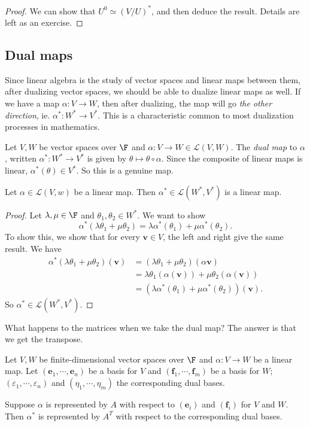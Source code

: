 \documentclass[a4paper]{article}
\begin{document}
\begin{proof}
  We can show that $U^0 \simeq (V/U)^*$, and then deduce the result. Details are left as an exercise.
\end{proof}

\subsection{Dual maps}
Since linear algebra is the study of vector spaces and linear maps between them, after dualizing vector spaces, we should be able to dualize linear maps as well. If we have a map $\alpha: V \to W$, then after dualizing, the map will go \emph{the other direction}, ie. $\alpha^*: W^* \to V^*$. This is a characteristic common to most dualization processes in mathematics.

\begin{defi}
  Let $V, W$ be vector spaces over $\F$ and $\alpha: V\to W \in \mathcal{L}(V, W)$. The \emph{dual map} to $\alpha$, written $\alpha^*: W^* \to V^*$ is given by $\theta \mapsto \theta \circ \alpha$. Since the composite of linear maps is linear, $\alpha^*(\theta) \in V^*$. So this is a genuine map.
\end{defi}

\begin{prop}
  Let $\alpha \in \mathcal{L}(V, w)$ be a linear map. Then $\alpha^* \in \mathcal{L}(W^*, V^*)$ is a linear map.
\end{prop}

\begin{proof}
  Let $\lambda, \mu \in \F$ and $\theta_1, \theta_2 \in W^*$. We want to show
  \[
    \alpha^*(\lambda \theta_1 + \mu \theta_2) = \lambda \alpha^*(\theta_1) + \mu \alpha^*(\theta_2).
  \]
  To show this, we show that for every $\mathbf{v} \in V$, the left and right give the same result. We have
  \begin{align*}
    \alpha^*(\lambda \theta_1 + \mu \theta_2)(\mathbf{v}) &= (\lambda \theta_1 + \mu \theta_2)(\alpha \mathbf{v}) \\
    &= \lambda \theta_1 (\alpha (\mathbf{v})) + \mu \theta_2 (\alpha(\mathbf{v})) \\
    &= (\lambda \alpha^*(\theta_1)+ \mu \alpha^*(\theta_2))(\mathbf{v}).
  \end{align*}
  So $\alpha^* \in \mathcal{L}(W^*, V^*)$.
\end{proof}

What happens to the matrices when we take the dual map? The answer is that we get the transpose.
\begin{prop}
  Let $V, W$ be finite-dimensional vector spaces over $\F$ and $\alpha: V\to W$ be a linear map. Let $(\mathbf{e}_1, \cdots, \mathbf{e}_n)$ be a basis for $V$ and $(\mathbf{f}_1, \cdots, \mathbf{f}_m)$ be a basis for $W$; $(\varepsilon_1, \cdots, \varepsilon_n)$ and $(\eta_1, \cdots, \eta_m)$ the corresponding dual bases.

  Suppose $\alpha$ is represented by $A$ with respect to $(\mathbf{e}_i)$ and $(\mathbf{f}_i)$ for $V$ and $W$. Then $\alpha^*$ is represented by $A^T$ with respect to the corresponding dual bases.
\end{prop}
\end{document}
